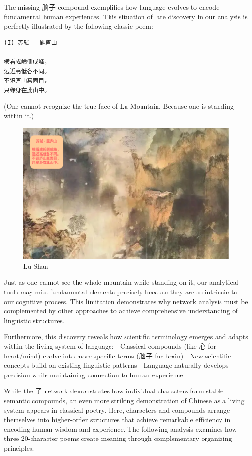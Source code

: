 \documentclass[
  11pt,
  letterpaper,
]{article}
\begin{document}
The missing 脑子 compound exemplifies how language evolves to encode
fundamental human experiences. This situation of late discovery in our
analysis is perfectly illustrated by the following classic poem:

\begin{verbatim}
(I) 苏轼 - 题庐山

横看成岭侧成峰，
远近高低各不同。
不识庐山真面目，
只缘身在此山中。
\end{verbatim}

(One cannot recognize the true face of Lu Mountain, Because one is
standing within it.)

\begin{figure}
\centering
\includegraphics{./images/poem_lu-shan.png}
\caption{Lu Shan}
\end{figure}

Just as one cannot see the whole mountain while standing on it, our
analytical tools may miss fundamental elements precisely because they
are so intrinsic to our cognitive process. This limitation demonstrates
why network analysis must be complemented by other approaches to achieve
comprehensive understanding of linguistic structures.

Furthermore, this discovery reveals how scientific terminology emerges
and adapts within the living system of language: - Classical compounds
(like 心 for heart/mind) evolve into more specific terms (脑子 for
brain) - New scientific concepts build on existing linguistic patterns -
Language naturally develops precision while maintaining connection to
human experience

While the 子 network demonstrates how individual characters form stable
semantic compounds, an even more striking demonstration of Chinese as a
living system appears in classical poetry. Here, characters and
compounds arrange themselves into higher-order structures that achieve
remarkable efficiency in encoding human wisdom and experience. The
following analysis examines how three 20-character poems create meaning
through complementary organizing principles.
\end{document}
